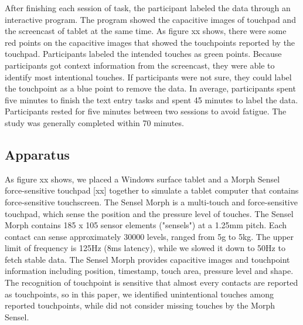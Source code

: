 
After finishing each session of task, the participant labeled the data through an interactive program. The program showed the capacitive images of touchpad and the screencast of tablet at the same time. As figure xx shows, there were some red points on the capacitive images that showed the touchpoints reported by the touchpad. Participants labeled the intended touches as green points. Because participants got context information from the screencast, they were able to identify most intentional touches. If participants were not sure, they could label the touchpoint as a blue point to remove the data. In average, participants spent five minutes to finish the text entry tasks and spent 45 minutes to label the data. Participants rested for five minutes between two sessions to avoid fatigue. The study was generally completed within 70 minutes.


\subsection{Apparatus}

As figure xx shows, we placed a Windows surface tablet and a Morph Sensel force-sensitive touchpad [xx] together to simulate a tablet computer that contains force-sensitive touchscreen. The Sensel Morph is a multi-touch and force-sensitive touchpad, which sense the position and the pressure level of touches. The Sensel Morph contains 185 x 105 sensor elements ("sensels") at a 1.25mm pitch. Each contact can sense approximately 30000 levels, ranged from 5g to 5kg. The upper limit of frequency is 125Hz (8ms latency), while we slowed it down to 50Hz to fetch stable data. The Sensel Morph provides capacitive images and touchpoint information including position, timestamp, touch area, pressure level and shape. The recognition of touchpoint is sensitive that almost every contacts are reported as touchpoints, so in this paper, we identified unintentional touches among reported touchpoints, while did not consider missing touches by the Morph Sensel.

